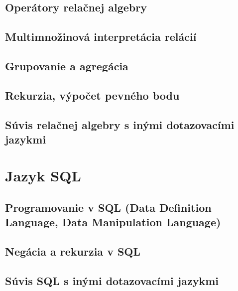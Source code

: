 \documentclass[10pt,a4paper]{article}
\begin{document}
\subsection{Operátory relačnej algebry}

\subsection{Multimnožinová interpretácia relácií}

\subsection{Grupovanie a agregácia}

\subsection{Rekurzia, výpočet pevného bodu}

\subsection{Súvis relačnej algebry s inými dotazovacími jazykmi}
    
\section{Jazyk SQL}

\subsection{Programovanie v SQL (Data Definition Language, Data Manipulation Language)}

\subsection{Negácia a rekurzia v SQL}

\subsection{Súvis SQL s inými dotazovacími jazykmi}
    
\end{document}
